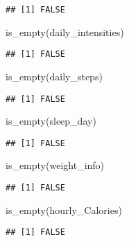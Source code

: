 \documentclass[
]{article}
\newenvironment{Shaded}{\begin{snugshade}}{\end{snugshade}}
\newcommand{\FunctionTok}[1]{\textcolor[rgb]{0.00,0.00,0.00}{#1}}
\newcommand{\NormalTok}[1]{#1}
\begin{document}
\begin{verbatim}
## [1] FALSE
\end{verbatim}

\begin{Shaded}
\begin{Highlighting}[]
\FunctionTok{is\_empty}\NormalTok{(daily\_intensities)}
\end{Highlighting}
\end{Shaded}

\begin{verbatim}
## [1] FALSE
\end{verbatim}

\begin{Shaded}
\begin{Highlighting}[]
\FunctionTok{is\_empty}\NormalTok{(daily\_steps)}
\end{Highlighting}
\end{Shaded}

\begin{verbatim}
## [1] FALSE
\end{verbatim}

\begin{Shaded}
\begin{Highlighting}[]
\FunctionTok{is\_empty}\NormalTok{(sleep\_day)}
\end{Highlighting}
\end{Shaded}

\begin{verbatim}
## [1] FALSE
\end{verbatim}

\begin{Shaded}
\begin{Highlighting}[]
\FunctionTok{is\_empty}\NormalTok{(weight\_info)}
\end{Highlighting}
\end{Shaded}

\begin{verbatim}
## [1] FALSE
\end{verbatim}

\begin{Shaded}
\begin{Highlighting}[]
\FunctionTok{is\_empty}\NormalTok{(hourly\_Calories)}
\end{Highlighting}
\end{Shaded}

\begin{verbatim}
## [1] FALSE
\end{verbatim}
\end{document}
